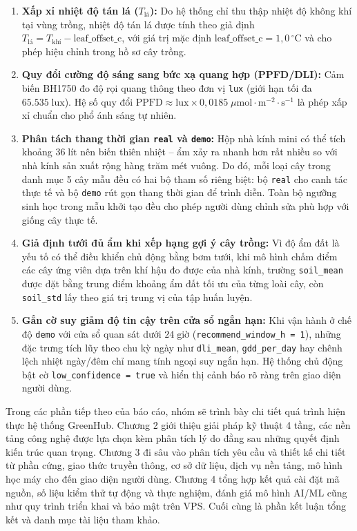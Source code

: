 \begin{enumerate}[leftmargin=*]
    \item \textbf{Xấp xỉ nhiệt độ tán lá (\(T_{\text{lá}}\)):} Do hệ thống chỉ thu thập nhiệt độ không khí tại vùng trồng, nhiệt độ tán lá được tính theo giả định \(T_{\text{lá}} = T_{\text{khí}} - \text{leaf\_offset\_c}\), với giá trị mặc định \(\text{leaf\_offset\_c} = 1{,}0\,^\circ\text{C}\) và cho phép hiệu chỉnh trong hồ sơ cây trồng.
    \item \textbf{Quy đổi cường độ sáng sang bức xạ quang hợp (PPFD/DLI):} Cảm biến BH1750 đo độ rọi quang thông theo đơn vị \texttt{lux} (giới hạn tối đa \(65.535\;\text{lux}\)). Hệ số quy đổi \(\text{PPFD} \approx \text{lux} \times 0{,}0185\;\mu\text{mol}\cdot\text{m}^{-2}\cdot\text{s}^{-1}\) là phép xấp xỉ chuẩn cho phổ ánh sáng tự nhiên.
    \item \textbf{Phân tách thang thời gian \texttt{real} và \texttt{demo}:} Hộp nhà kính mini có thể tích khoảng \(36\;\text{lít}\) nên biến thiên nhiệt -- ẩm xảy ra nhanh hơn rất nhiều so với nhà kính sản xuất rộng hàng trăm mét vuông. Do đó, mỗi loại cây trong danh mục 5 cây mẫu đều có hai bộ tham số riêng biệt: bộ \texttt{real} cho canh tác thực tế và bộ \texttt{demo} rút gọn thang thời gian để trình diễn. Toàn bộ ngưỡng sinh học trong mẫu khởi tạo đều cho phép người dùng chỉnh sửa phù hợp với giống cây thực tế.
    \item \textbf{Giả định tưới đủ ẩm khi xếp hạng gợi ý cây trồng:} Vì độ ẩm đất là yếu tố có thể điều khiển chủ động bằng bơm tưới, khi mô hình chấm điểm các cây ứng viên dựa trên khí hậu đo được của nhà kính, trường \texttt{soil\_mean} được đặt bằng trung điểm khoảng ẩm đất tối ưu của từng loài cây, còn \texttt{soil\_std} lấy theo giá trị trung vị của tập huấn luyện.
    \item \textbf{Gắn cờ suy giảm độ tin cậy trên cửa sổ ngắn hạn:} Khi vận hành ở chế độ \texttt{demo} với cửa sổ quan sát dưới \(24\;\text{giờ}\) (\texttt{recommend\_window\_h = 1}), những đặc trưng tích lũy theo chu kỳ ngày như \texttt{dli\_mean}, \texttt{gdd\_per\_day} hay chênh lệch nhiệt ngày/đêm chỉ mang tính ngoại suy ngắn hạn. Hệ thống chủ động bật cờ \texttt{low\_confidence = true} và hiển thị cảnh báo rõ ràng trên giao diện người dùng.
\end{enumerate}

Trong các phần tiếp theo của báo cáo, nhóm sẽ trình bày chi tiết quá trình hiện thực hệ thống GreenHub. Chương 2 giới thiệu giải pháp kỹ thuật 4 tầng, các nền tảng công nghệ được lựa chọn kèm phân tích lý do đằng sau những quyết định kiến trúc quan trọng. Chương 3 đi sâu vào phân tích yêu cầu và thiết kế chi tiết từ phần cứng, giao thức truyền thông, cơ sở dữ liệu, dịch vụ nền tảng, mô hình học máy cho đến giao diện người dùng. Chương 4 tổng hợp kết quả cài đặt mã nguồn, số liệu kiểm thử tự động và thực nghiệm, đánh giá mô hình AI/ML cũng như quy trình triển khai và bảo mật trên VPS. Cuối cùng là phần kết luận tổng kết và danh mục tài liệu tham khảo.
